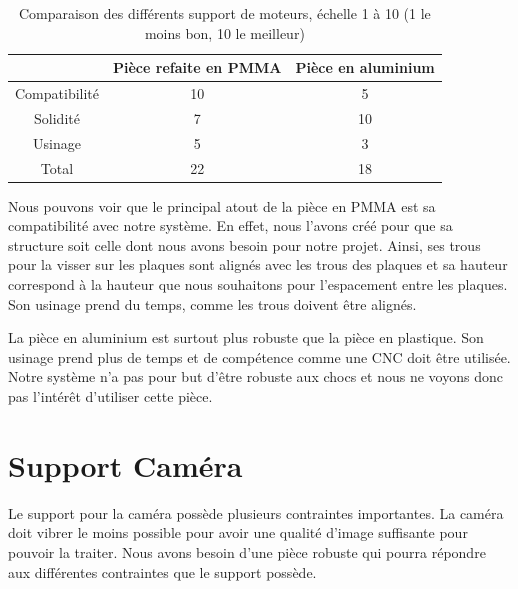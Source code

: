 \documentclass[
	a4paper,									%
	11pt,										%
	twoside,									%
	openright,									%
	notitlepage,									%
	parskip=half,								%
]{scrreprt}										%
\begin{document}
\begin{table}[!ht]
    \begin{center}
        \vspace{5mm}
        \label{tab:table6}
        \begin{tabular}{c|c|c} %
            \toprule
            \textbf{ } & \textbf{Pièce refaite en PMMA} & \textbf{Pièce en aluminium}\\
            \midrule
            Compatibilité & 10 & 5\\
            Solidité & 7 & 10\\
            Usinage & 5 & 3\\
			\midrule
			Total & 22 & 18\\
            \bottomrule
        \end{tabular}
    \end{center}    
	\caption{Comparaison des différents support de moteurs, échelle 1 à 10 (1 le moins bon, 10 le meilleur)}
\end{table}

Nous pouvons voir que le principal atout de la pièce en PMMA est sa compatibilité avec notre système. En effet, nous l'avons 
créé pour que sa structure soit celle dont nous avons besoin pour notre projet. Ainsi, ses trous pour la visser sur les plaques
sont alignés avec les trous des plaques et sa hauteur correspond à la hauteur que nous souhaitons pour l'espacement entre les 
plaques. Son usinage prend du temps, comme les trous doivent être alignés. \par

La pièce en aluminium est surtout plus robuste que la pièce en plastique. Son usinage prend plus de temps et de compétence 
comme une CNC doit être utilisée. Notre système n'a pas pour but d'être robuste aux chocs et nous ne voyons donc pas l'intérêt
d'utiliser cette pièce. \par

\newpage
\section{Support Caméra}

Le support pour la caméra possède plusieurs contraintes importantes. La caméra doit vibrer le moins possible
pour avoir une qualité d'image suffisante pour pouvoir la traiter. Nous avons besoin d'une pièce robuste qui 
pourra répondre aux différentes contraintes que le support possède. \par
\end{document}
